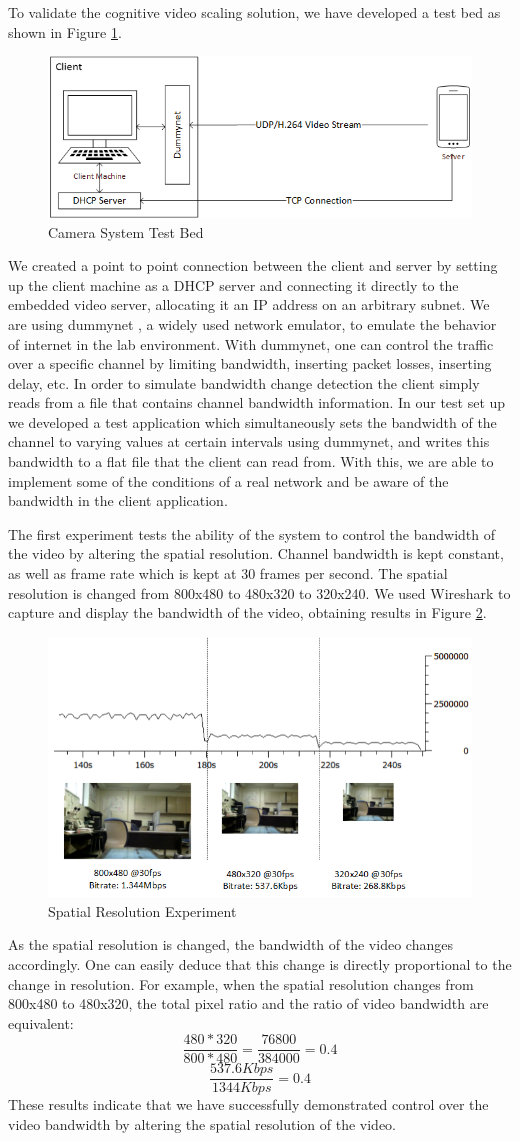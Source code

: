 \documentclass[preprint, 12pt]{elsarticle}
\begin{document}
To validate the cognitive video scaling solution, we have developed a test bed as shown in Figure \ref{fig:Testbed}.
\begin{figure}[h]
\centering
\includegraphics[width=0.5\linewidth]{CameraSystemTestbed.png}
\caption{Camera System Test Bed}
\label{fig:Testbed}
\end{figure}
We created a point to point connection between the client and server by setting up the client machine as a DHCP server and connecting it directly to the embedded video server, allocating it an IP address on an arbitrary subnet. We are using dummynet , a widely used network emulator, to emulate the behavior of internet in the lab environment. With dummynet, one can control the traffic over a specific channel by limiting bandwidth, inserting packet losses, inserting delay, etc. In order to simulate bandwidth change detection the client simply reads from a file that contains channel bandwidth information. In our test set up we developed a test application which simultaneously sets the bandwidth of the channel to varying values at certain intervals using dummynet, and writes this bandwidth to a flat file that the client can read from. With this, we are able to implement some of the conditions of a real network and be aware of the bandwidth in the client application. 

The first experiment tests the ability of the system to control the bandwidth of the video by altering the spatial resolution. Channel bandwidth is kept constant, as well as frame rate which is kept at 30 frames per second. The spatial resolution is changed from 800x480 to 480x320 to 320x240. We used Wireshark to capture and display the bandwidth of the video, obtaining results in Figure \ref{fig:SpatialTest}.
\begin{figure}[h]
\centering
\includegraphics[width=0.5\linewidth]{SpatialResolutionTest.png}
\caption{Spatial Resolution Experiment}
\label{fig:SpatialTest}
\end{figure}
As the spatial resolution is changed, the bandwidth of the video changes accordingly. One can easily deduce that this change is directly proportional to the change in resolution. For example, when the spatial resolution changes from 800x480 to 480x320, the total pixel ratio and the ratio of video bandwidth are equivalent:
\[ \frac{480 * 320}{800 * 480} = \frac{76800}{384000} = 0.4 \]
\[ \frac{537.6Kbps}{1344Kbps} = 0.4 \]
These results indicate that we have successfully demonstrated control over the video bandwidth by altering the spatial resolution of the video. 
\end{document}
